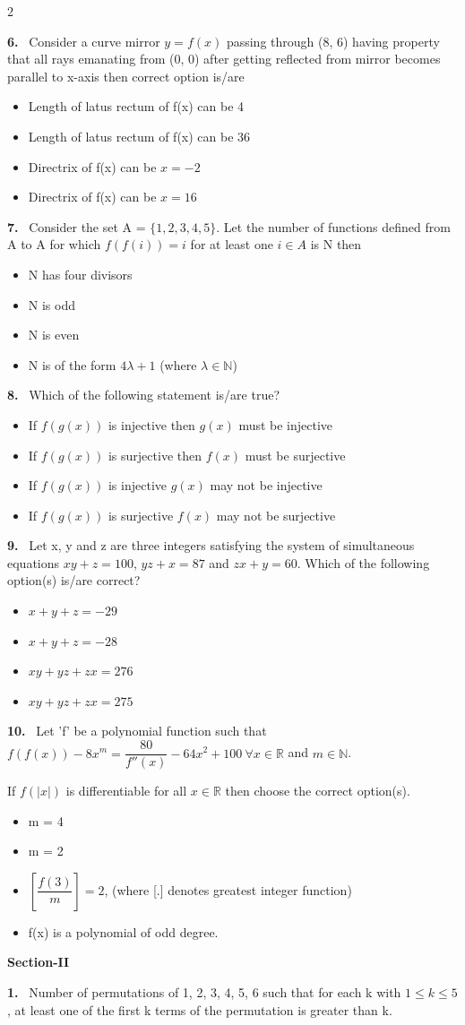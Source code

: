 \documentclass[10pt]{extarticle}
\newcommand{\sect}[1]{\par\smallskip\noindent\textbf{#1}\par}
\newcommand{\qn}[1]{\par\smallskip\noindent\textbf{#1.}~}
\newenvironment{qoptions}{\begin{itemize}[leftmargin=1.8em,itemsep=1pt,topsep=2pt,label={}]}{\end{itemize}}
\newcommand{\opt}[2]{\item[(#1)] #2}
\begin{document}
\begin{multicols}{2}
\qn{6} Consider a curve mirror $y=f(x)$ passing through (8, 6) having property that all rays emanating from (0, 0) after getting reflected from mirror becomes parallel to x-axis then correct option is/are
\begin{qoptions}
\opt{A}{Length of latus rectum of f(x) can be 4}
\opt{B}{Length of latus rectum of f(x) can be 36}
\opt{C}{Directrix of f(x) can be $x=-2$}
\opt{D}{Directrix of f(x) can be $x=16$}
\end{qoptions}

\qn{7} Consider the set A = $\{1,2,3,4,5\}$.
Let the number of functions defined from A to A for which $f(f(i))=i$ for at least one $i\in A$ is N then
\begin{qoptions}
\opt{A}{N has four divisors}
\opt{B}{N is odd}
\opt{C}{N is even}
\opt{D}{N is of the form $4\lambda+1$ (where $\lambda\in\mathbb{N}$)}
\end{qoptions}

\qn{8} Which of the following statement is/are true?
\begin{qoptions}
\opt{A}{If $f(g(x))$ is injective then $g(x)$ must be injective}
\opt{B}{If $f(g(x))$ is surjective then $f(x)$ must be surjective}
\opt{C}{If $f(g(x))$ is injective $g(x)$ may not be injective}
\opt{D}{If $f(g(x))$ is surjective $f(x)$ may not be surjective}
\end{qoptions}

\qn{9} Let x, y and z are three integers satisfying the system of simultaneous equations
$xy+z=100$, $yz+x=87$ and $zx+y=60$.
Which of the following option(s) is/are correct?
\begin{qoptions}
\opt{A}{$x+y+z=-29$}
\opt{B}{$x+y+z=-28$}
\opt{C}{$xy+yz+zx=276$}
\opt{D}{$xy+yz+zx=275$}
\end{qoptions}

\qn{10} Let 'f' be a polynomial function such that $f(f(x))-8x^m=\dfrac{80}{f''(x)}-64x^2+100\ \forall x\in\mathbb{R}$ and $m\in\mathbb{N}$.

If $f(|x|)$ is differentiable for all $x\in\mathbb{R}$ then choose the correct option(s).
\begin{qoptions}
\opt{A}{m = 4}
\opt{B}{m = 2}
\opt{C}{$\left[\dfrac{f(3)}{m}\right]=2$, (where [.] denotes greatest integer function)}
\opt{D}{f(x) is a polynomial of odd degree.}
\end{qoptions}

\sect{Section-II}

\qn{1} Number of permutations of 1, 2, 3, 4, 5, 6 such that for each k with $1\le k\le5$, at least one of the first k terms of the permutation is greater than k.


\end{multicols}
\end{document}
